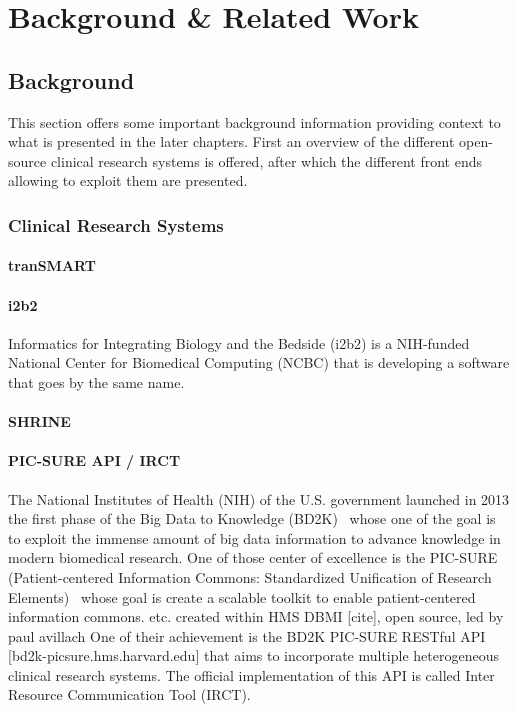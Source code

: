 \chapter{Background \& Related Work}

\section{Background}
This section offers some important background information providing context to what is presented in the later chapters. 
First an overview of the different open-source clinical research systems is offered, 
after which the different front ends allowing to exploit them are presented.

\subsection{Clinical Research Systems}

\subsubsection{tranSMART}

\subsubsection{i2b2}
Informatics for Integrating Biology and the Bedside (i2b2) is a NIH-funded National Center for Biomedical Computing (NCBC) that is developing a software that goes by the same name. 




\subsubsection{SHRINE}

\subsubsection{PIC-SURE API / IRCT}

The National Institutes of Health (NIH) of the U.S. government launched in 2013 the first phase of the Big Data to Knowledge (BD2K)~\cite{BD2K} whose one of the goal is to exploit the immense amount of big data information to advance knowledge in modern biomedical research.
One of those center of excellence is the PIC-SURE (Patient-centered Information Commons: Standardized Unification of Research Elements)~\cite{PIC-SURE} whose goal is create a scalable toolkit to enable patient-centered information commons.
etc. created within HMS DBMI [cite], open source, 
led by paul avillach One of their achievement is the BD2K PIC-SURE RESTful API [bd2k-picsure.hms.harvard.edu] that aims to incorporate multiple heterogeneous clinical research systems. 
The official implementation of this API is called Inter Resource Communication Tool (IRCT).

